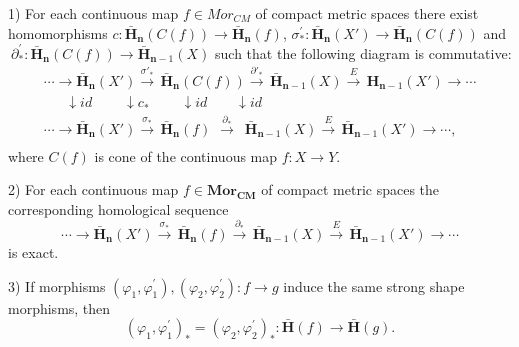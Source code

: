 \documentclass[10pt]{article}
\theoremstyle{definition}
\begin{document}
1) For each continuous map $f\in Mo{{r}_{CM}}$ of compact metric spaces there exist homomorphisms $c:{{\mathbf{ \bar{H}}}_{\mathbf{n}}}( C(f) )\to {{\mathbf{\bar{H}}}_{\mathbf{n}}}(  f  )$,  $\sigma _{*}^{'}:{{\mathbf{\bar{H}}}_{\mathbf{n}}}( {{X}'} )\to {{\mathbf{\bar{H}}}_{\mathbf{n}}}( C( f ) )$ and $~\partial _{*}^{'}:{{\mathbf{\bar{H}}}_{\mathbf{n}}}( C( f ) )\to {{\mathbf{\bar{H}}}_{\mathbf{n}-1}}( X )$ such that the following diagram is commutative:
$$
\begin{matrix}
   \cdots \to {{\mathbf{\bar{H}}}_{\mathbf{n}}}( {{X}'} )\overset{{{\sigma' }_{*}}}{\mathop{\to }}\,{{\mathbf{\bar{H}}}_{\mathbf{n}}}( C(f) )\overset{{{\partial' }_{*}}}{\mathop{\to }}\,{{\mathbf{\bar{H}}}_{\mathbf{n}-1}}( X )\overset{E}{\mathop{\to }}\,{{\mathbf{H}}_{\mathbf{n}-1}}( {{X}'} )\to \cdots \\
   ~~~~~~~\downarrow {id} ~~~~~~~~~~\downarrow c_{*}~~~~~~~~~~\downarrow {id}~~~~~~~~~\downarrow {id} ~~~~~~~ \\
   \cdots \to {{\mathbf{\bar{H}}}_{\mathbf{n}}}( {{X}'} )\overset{{{\sigma }_{*}}}{\mathop{\to }}\,{{\mathbf{\bar{H}}}_{\mathbf{n}}}( f )\overset{{{\partial }_{*}}}{\mathop{~\to~ }}\,{{\mathbf{\bar{H}}}_{\mathbf{n}-1}}( X )\overset{E}{\mathop{\to }}\,{{\mathbf{\bar{H}}}_{\mathbf{n}-1}}( {{X}'} )\to \cdots ,\\
\end{matrix}
$$
where $C(f)$ is cone of the continuous map $f:X \to Y$.

2) For each continuous map $f\in \mathbf{Mo{{r}_{CM}}}$ of compact metric spaces the corresponding homological sequence
	$$\cdots \to {{\mathbf{\bar{H}}}_{\mathbf{n}}}( {{X}'} )\overset{{{\sigma }_{*}}}{\mathop{\to }}\,{{\mathbf{\bar{H}}}_{\mathbf{n}}}( f )\overset{{{\partial }_{*}}}{\mathop{\to }}\,{{\mathbf{\bar{H}}}_{\mathbf{n}-1}}( X )\overset{E}{\mathop{\to }}\,{{\mathbf{\bar{H}}}_{\mathbf{n}-1}}( {{X}'} )\to \cdots $$
is exact.

3) If morphisms  $( {{\varphi }_{1}},\varphi _{1}^{'} ),( {{\varphi }_{2}},\varphi _{2}^{'} ):f\to g$ induce the same strong shape morphisms, then
$${{( {{\varphi }_{1}},\varphi _{1}^{'} )}_{*}}={{( {{\varphi }_{2}},\varphi _{2}^{'} )}_{*}}:\mathbf{\bar{H}}( f )\to \mathbf{\bar{H}}( g ).$$                 
\end{document}
